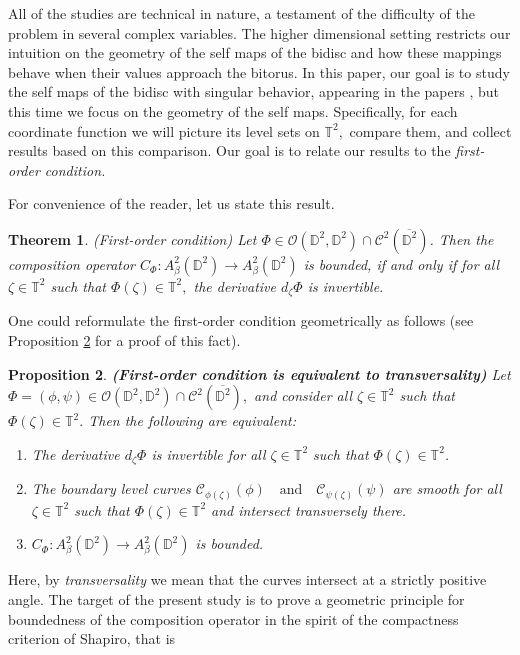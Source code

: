 \documentclass[12pt]{amsart}
\newtheorem{theorem}{Theorem}[section]
\newtheorem{proposition}[theorem]{Proposition}
\numberwithin{equation}{section}
\begin{document}
All of the studies are technical in nature, a testament of the difficulty of the problem in several complex variables. The higher dimensional setting restricts our intuition on the geometry of the self maps of the bidisc and how these mappings behave when their values approach the  bitorus. In this paper, our goal is to study the self maps of the bidisc with singular behavior, appearing in the papers \cite{Me, Me2}, but this time we focus on the geometry of the self maps. Specifically, for each coordinate function we will picture its level sets on $\mathbb{T}^2,$ compare them, and collect results based on this comparison. Our goal is to relate our results to the \textit{first-order condition.}

For convenience of the reader, let us state this result.

\begin{theorem} (First-order condition) Let $\Phi \in \mathcal{O}(\mathbb{D}^2,\mathbb{D}^2)\cap \mathcal{C}^2(\overline{\mathbb{D}^2})$. Then the composition operator $C_{\Phi}:A^2_{\beta}(\mathbb{D}^2)\to A^2_{\beta}(\mathbb{D}^2) $ is bounded, if and only if for all $\zeta\in \mathbb{T}^2$ such that $\Phi(\zeta)\in \mathbb{T}^2,$ the derivative $d_{\zeta} \Phi$ is invertible. 
\label{characterization}
\end{theorem}
One could reformulate the first-order condition geometrically as follows (see Proposition \ref{transverse} for a proof of this fact).
\begin{proposition}\label{transverse}\textbf{(First-order condition is equivalent to transversality)}
Let $\Phi=(\phi,\psi)\in \mathcal O(\mathbb D^2,\mathbb D^2)\cap \mathcal{C}^2(\overline{\mathbb D^2}),$
and consider all $\zeta\in \mathbb T^2$ such that
$\Phi(\zeta)\in \mathbb T^2.$
Then the following are equivalent:
\begin{enumerate}
    \item The derivative $d_{\zeta}\Phi$ is invertible for all $\zeta\in\mathbb{T}^2$ such that $\Phi(\zeta)\in\mathbb{T}^2$.
    \item The boundary level curves
    $\mathcal{C}_{\phi(\zeta)}(\phi)\quad \mathrm{and}\quad
    \mathcal{C}_{\psi(\zeta)}(\psi)$
    are smooth for all $\zeta\in\mathbb{T}^2$ such that $\Phi(\zeta)\in\mathbb{T}^2$ and intersect transversely there.
    \item $C_{\Phi}:A^2_{\beta}(\mathbb{D}^2)\to A^2_{\beta}(\mathbb{D}^2)$ is bounded.
\end{enumerate}
\end{proposition}
Here, by \textit{transversality} we mean that the curves intersect at a strictly positive angle.
The target of the present study is to prove a geometric principle for boundedness of the composition operator in the spirit of the compactness criterion of Shapiro, that is 
\end{document}
